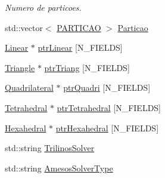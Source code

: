 \begin{DoxyCompactItemize}
\begin{DoxyCompactList}\small\item\em Numero de particoes. \end{DoxyCompactList}\item 
std\+::vector$<$ \hyperlink{structPARTICAO}{P\+A\+R\+T\+I\+C\+AO} $>$ \hyperlink{classGeProb_a39012a295f18016463a00946affc3818}{Particao}
\item 
\hyperlink{classLinear}{Linear} $\ast$ \hyperlink{classGeProb_af9350545b7ee2ebe6488a50dd1f38c8c}{ptr\+Linear} \mbox{[}N\+\_\+\+F\+I\+E\+L\+DS\mbox{]}
\item 
\hyperlink{classTriangle}{Triangle} $\ast$ \hyperlink{classGeProb_a9fa6ab6ca8b9a2352642a72042d8cf4d}{ptr\+Triang} \mbox{[}N\+\_\+\+F\+I\+E\+L\+DS\mbox{]}
\item 
\hyperlink{classQuadrilateral}{Quadrilateral} $\ast$ \hyperlink{classGeProb_ada73c5b700f7681fde499a3a27ff377e}{ptr\+Quadri} \mbox{[}N\+\_\+\+F\+I\+E\+L\+DS\mbox{]}
\item 
\hyperlink{classTetrahedral}{Tetrahedral} $\ast$ \hyperlink{classGeProb_a4e2d7b57253812234e2417097659c40c}{ptr\+Tetrahedral} \mbox{[}N\+\_\+\+F\+I\+E\+L\+DS\mbox{]}
\item 
\hyperlink{classHexahedral}{Hexahedral} $\ast$ \hyperlink{classGeProb_aecb008dc7914d62933407aecbcbbae0a}{ptr\+Hexahedral} \mbox{[}N\+\_\+\+F\+I\+E\+L\+DS\mbox{]}
\item 
std\+::string \hyperlink{classGeProb_aac89bac6728a7f42998e0edb80dc835d}{Trilinos\+Solver}
\item 
std\+::string \hyperlink{classGeProb_a000f412eadf9ce5cf4f5391012283330}{Amesos\+Solver\+Type}
\end{DoxyCompactItemize}
